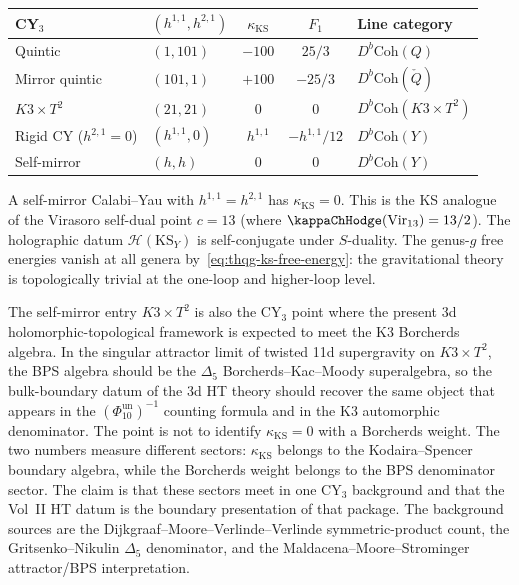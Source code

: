 \begin{center}
\renewcommand{\arraystretch}{1.25}
\small
\begin{tabular}{llccl}
\textbf{CY$_3$} & $(h^{1,1}, h^{2,1})$
 & $\kappa_{\mathrm{KS}}$ & $F_1$ & \textbf{Line category} \\
\hline
Quintic & $(1, 101)$ & $-100$ & $25/3$ & $D^b\mathrm{Coh}(Q)$ \\
Mirror quintic & $(101, 1)$ & $+100$ & $-25/3$ & $D^b\mathrm{Coh}(\check{Q})$ \\
$K3 \times T^2$ & $(21, 21)$ & $0$ & $0$ & $D^b\mathrm{Coh}(K3 \times T^2)$ \\
Rigid CY ($h^{2,1} = 0$) & $(h^{1,1}, 0)$ & $h^{1,1}$ & $-h^{1,1}/12$ & $D^b\mathrm{Coh}(Y)$ \\
Self-mirror & $(h, h)$ & $0$ & $0$ & $D^b\mathrm{Coh}(Y)$
\end{tabular}
\end{center}

\begin{remark}
A self-mirror Calabi--Yau with $h^{1,1} = h^{2,1}$ has
$\kappa_{\mathrm{KS}} = 0$. This is the KS analogue of the Virasoro
self-dual point $c = 13$ (where $\kappaChHodge(\mathrm{Vir}_{13}) = 13/2$).
The holographic datum $\mathcal{H}(\mathrm{KS}_Y)$ is self-conjugate
under $S$-duality. The genus-$g$ free energies vanish at all genera
by~\eqref{eq:thqg-ks-free-energy}: the gravitational theory is
topologically trivial at the one-loop and higher-loop level.
\end{remark}

\begin{conjecture}
\label{conj:k3t2-bps-gravity-face}
The self-mirror entry $K3 \times T^2$ is also the CY$_3$ point where
the present 3d holomorphic-topological framework is expected to meet
the K3 Borcherds algebra. In the singular attractor limit of twisted
11d supergravity on $K3 \times T^2$, the BPS algebra should be the
$\Delta_5$ Borcherds--Kac--Moody superalgebra, so the bulk-boundary
datum of the 3d HT theory should recover the same object that appears
in the $(\Phi_{10}^{\mathrm{un}})^{-1}$ counting formula and in the K3 automorphic
denominator. The point is not to identify
$\kappa_{\mathrm{KS}} = 0$ with a Borcherds weight. The two numbers
measure different sectors: $\kappa_{\mathrm{KS}}$ belongs to the
Kodaira--Spencer boundary algebra, while the Borcherds weight belongs
to the BPS denominator sector. The claim is that these sectors meet in
one CY$_3$ background and that the Vol~II HT datum is the boundary
presentation of that package. The background sources are the
Dijkgraaf--Moore--Verlinde--Verlinde symmetric-product count, the
Gritsenko--Nikulin $\Delta_5$ denominator, and the
Maldacena--Moore--Strominger attractor/BPS interpretation.
\end{conjecture}


